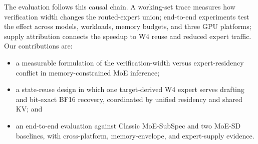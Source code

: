 The evaluation follows this causal chain. A working-set trace measures how
verification width changes the routed-expert union; end-to-end experiments test the
effect across models, workloads, memory budgets, and three GPU platforms; supply
attribution connects the speedup to W4 reuse and reduced expert traffic. Our
contributions are:

\begin{itemize}
  \item a measurable formulation of the verification-width versus expert-residency
  conflict in memory-constrained MoE inference;
  \item a state-reuse design in which one target-derived W4 expert serves drafting and
  bit-exact BF16 recovery, coordinated by unified residency and shared KV; and
  \item an end-to-end evaluation against Classic MoE-SubSpec and two MoE-SD
  baselines, with cross-platform, memory-envelope, and expert-supply evidence.
\end{itemize}

